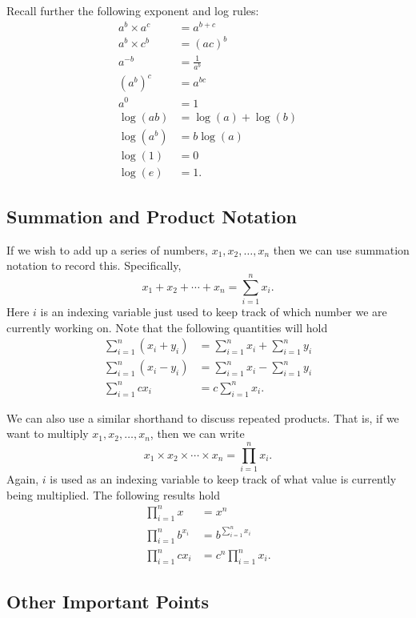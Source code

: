 \documentclass[
  letterpaper,
  DIV=11,
  numbers=noendperiod]{scrreprt}
\theoremstyle{definition}
\theoremstyle{definition}
\theoremstyle{definition}
\theoremstyle{remark}
\begin{document}
Recall further the following exponent and log rules:\begin{align*}
a^b\times a^c &= a^{b + c} \\
a^b\times c^b &= (ac)^b \\
a^{-b} &= \frac{1}{a^b} \\
\left(a^{b}\right)^c &= a^{bc} \\
a^0 &= 1 \\
\log(ab) &= \log(a) + \log(b) \\
\log(a^b) &= b\log(a) \\
\log(1) &= 0 \\
\log(e) &= 1.
\end{align*}

\subsection*{Summation and Product
Notation}\label{summation-and-product-notation}

If we wish to add up a series of numbers, \(x_1,x_2,\dots,x_n\) then we
can use summation notation to record this. Specifically,
\[x_1 + x_2 + \cdots + x_n = \sum_{i=1}^n x_i.\] Here \(i\) is an
indexing variable just used to keep track of which number we are
currently working on. Note that the following quantities will hold
\begin{align*}
    \sum_{i=1}^n (x_i + y_i) &= \sum_{i=1}^n x_i + \sum_{i=1}^n y_i \\
    \sum_{i=1}^n (x_i - y_i) &= \sum_{i=1}^n x_i - \sum_{i=1}^n y_i \\
    \sum_{i=1}^n cx_i &= c\sum_{i=1}^n x_i.
\end{align*}

We can also use a similar shorthand to discuss repeated products. That
is, if we want to multiply \(x_1,x_2,\dots,x_n\), then we can write
\[x_1\times x_2\times\cdots\times x_n = \prod_{i=1}^n x_i.\] Again,
\(i\) is used as an indexing variable to keep track of what value is
currently being multiplied. The following results hold \begin{align*}
    \prod_{i=1}^n x &= x^n \\
    \prod_{i=1}^n b^{x_i} &= b^{\sum_{i=1}^n x_i} \\
    \prod_{i=1}^n cx_i &= c^n\prod_{i=1}^n x_i.
\end{align*}

\subsection*{Other Important Points}\label{other-important-points}
\end{document}
